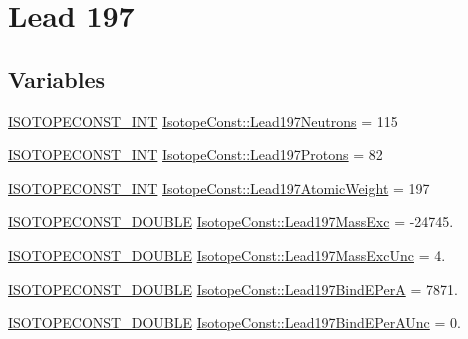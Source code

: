 \hypertarget{group___isotope_const-_lead-_pb197}{}\section{Lead 197}
\label{group___isotope_const-_lead-_pb197}
\subsection*{Variables}
\begin{DoxyCompactItemize}
\item 
\mbox{\hyperlink{group___isotope_const-_macros_ga5f18360b3e99483a35c32d789e62621c}{I\+S\+O\+T\+O\+P\+E\+C\+O\+N\+S\+T\+\_\+\+I\+NT}} \mbox{\hyperlink{group___isotope_const-_lead-_pb197_gad58e46e0e724b3fb37b3be4a7c69eab0}{Isotope\+Const\+::\+Lead197\+Neutrons}} = 115
\item 
\mbox{\hyperlink{group___isotope_const-_macros_ga5f18360b3e99483a35c32d789e62621c}{I\+S\+O\+T\+O\+P\+E\+C\+O\+N\+S\+T\+\_\+\+I\+NT}} \mbox{\hyperlink{group___isotope_const-_lead-_pb197_ga6eb045168cb57c47863fe640171b786c}{Isotope\+Const\+::\+Lead197\+Protons}} = 82
\item 
\mbox{\hyperlink{group___isotope_const-_macros_ga5f18360b3e99483a35c32d789e62621c}{I\+S\+O\+T\+O\+P\+E\+C\+O\+N\+S\+T\+\_\+\+I\+NT}} \mbox{\hyperlink{group___isotope_const-_lead-_pb197_gac1d8cb91d8cd38a3c3651254bd59b10b}{Isotope\+Const\+::\+Lead197\+Atomic\+Weight}} = 197
\item 
\mbox{\hyperlink{group___isotope_const-_macros_ga8f45a7272ce02c0b4c65c44636ed719a}{I\+S\+O\+T\+O\+P\+E\+C\+O\+N\+S\+T\+\_\+\+D\+O\+U\+B\+LE}} \mbox{\hyperlink{group___isotope_const-_lead-_pb197_ga305167d6dd6f67bff1d6e3237f5fd1a4}{Isotope\+Const\+::\+Lead197\+Mass\+Exc}} = -\/24745.
\item 
\mbox{\hyperlink{group___isotope_const-_macros_ga8f45a7272ce02c0b4c65c44636ed719a}{I\+S\+O\+T\+O\+P\+E\+C\+O\+N\+S\+T\+\_\+\+D\+O\+U\+B\+LE}} \mbox{\hyperlink{group___isotope_const-_lead-_pb197_gad9232262e59f71d17f8461365d84ae1e}{Isotope\+Const\+::\+Lead197\+Mass\+Exc\+Unc}} = 4.
\item 
\mbox{\hyperlink{group___isotope_const-_macros_ga8f45a7272ce02c0b4c65c44636ed719a}{I\+S\+O\+T\+O\+P\+E\+C\+O\+N\+S\+T\+\_\+\+D\+O\+U\+B\+LE}} \mbox{\hyperlink{group___isotope_const-_lead-_pb197_ga403e6f2e559c5234c0018ccea659d302}{Isotope\+Const\+::\+Lead197\+Bind\+E\+PerA}} = 7871.
\item 
\mbox{\hyperlink{group___isotope_const-_macros_ga8f45a7272ce02c0b4c65c44636ed719a}{I\+S\+O\+T\+O\+P\+E\+C\+O\+N\+S\+T\+\_\+\+D\+O\+U\+B\+LE}} \mbox{\hyperlink{group___isotope_const-_lead-_pb197_gaaa90e2de0093f2b80b348fabbd995dcf}{Isotope\+Const\+::\+Lead197\+Bind\+E\+Per\+A\+Unc}} = 0.

\end{DoxyCompactItemize}
